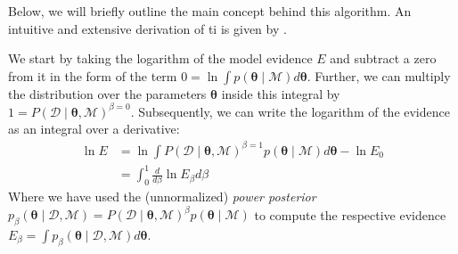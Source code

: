 \documentclass[twocolumn]{aastex631}
\begin{document}
Below, we will briefly outline the main concept behind this algorithm. An intuitive and extensive derivation of \gls{ti} is given by \citep{aponte_introduction_2022}.

We start by taking the logarithm of the model evidence $E$ and subtract a zero from it in the form of the term $0 = \ln \int p(\boldsymbol{\theta} \mid \mathcal{M}) d\boldsymbol{\theta}$. Further, we can multiply the distribution over the parameters $\boldsymbol{\theta}$ inside this integral by $1 = P \left( \boldsymbol{\mathcal{D}} \mid \boldsymbol{\theta}, \mathcal{M} \right)^{\beta=0}$. Subsequently, we can write the logarithm of the evidence as an integral over a derivative:
%
\begin{equation} \label{eq:ti}
    \begin{aligned}
        \ln E &= \ln \int P \left( \boldsymbol{\mathcal{D}} \mid \boldsymbol{\theta}, \mathcal{M} \right)^{\beta=1} p \left( \boldsymbol{\theta} \mid \mathcal{M} \right) d\boldsymbol{\theta} - \ln E_0 \\
        &= \int_0^1 \frac{d}{d\beta} \ln E_\beta d\beta
    \end{aligned}
\end{equation}
%
Where we have used the (unnormalized) \emph{power posterior} $p_\beta \left( \boldsymbol{\theta} \mid \boldsymbol{\mathcal{D}}, \mathcal{M} \right) = P \left( \boldsymbol{\mathcal{D}} \mid \boldsymbol{\theta}, \mathcal{M} \right)^\beta p \left( \boldsymbol{\theta} \mid \mathcal{M} \right)$ to compute the respective evidence $E_\beta = \int p_\beta \left( \boldsymbol{\theta} \mid \boldsymbol{\mathcal{D}}, \mathcal{M} \right) d\boldsymbol{\theta}$.
\end{document}
